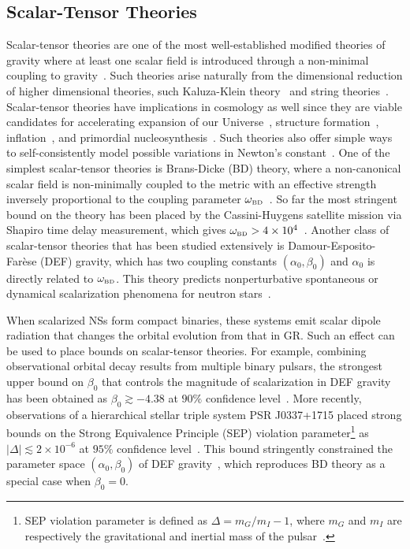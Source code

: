 \documentclass[prd,twocolumn,nofootinbib]{revtex4-1}
\newcommand{\BD}{{\mbox{\tiny BD}}}
\begin{document}
 \subsection{Scalar-Tensor Theories}
Scalar-tensor theories are one of the most well-established modified theories of gravity where at least one scalar field is introduced through a non-minimal coupling to gravity~\cite{Berti:2015itd,Chiba:1997ms,PhysRevD.6.2077}. Such theories arise naturally from the dimensional reduction of higher dimensional theories, such Kaluza-Klein theory~\cite{Fujii:2003pa,Overduin:1998pn} and string theories~\cite{polchinski1,polchinski2}.
Scalar-tensor theories have implications in cosmology as well since they are viable candidates for accelerating expansion of our Universe~\cite{Brax:2004qh,PhysRevD.73.083510,PhysRevD.62.123510,PhysRevD.66.023525,Schimd:2004nq}, structure formation~\cite{Brax:2005ew}, inflation~\cite{Burd:1991ns,Barrow:1990nv,Banerjee:1993ct,Clifton:2011jh}, and primordial nucleosynthesis~\cite{Coc:2006rt,Damour:1998ae,Larena:2005tu,Torres:1995je}. Such theories also offer simple ways to self-consistently model possible variations in Newton's constant~\cite{Clifton:2011jh}. One of the simplest scalar-tensor theories is Brans-Dicke (BD) theory, where a non-canonical scalar field is non-minimally coupled to the metric with an effective strength inversely proportional to the coupling parameter $\omega_{\BD}$~\cite{PhysRev.124.925,Scharre:2001hn}. So far the most stringent bound on the theory has been placed by the Cassini-Huygens satellite mission via Shapiro time delay measurement, which gives $\omega_{\BD}>4\times10^4$~\cite{Bertotti:2003rm}. Another class of scalar-tensor theories that has been studied extensively is Damour-Esposito-Far\`ese (DEF) gravity, which has two coupling constants $(\alpha_0,\beta_0)$ and $\alpha_0$ is directly related to $\omega_\BD$. This theory predicts nonperturbative spontaneous or dynamical scalarization phenomena for neutron stars~\cite{PhysRevLett.70.2220,Barausse:2012da}. 

When scalarized NSs form compact binaries, these systems emit scalar dipole radiation that changes the orbital evolution from that in GR. Such an effect can be used to place bounds on scalar-tensor theories. For example, combining observational orbital decay results from multiple binary pulsars, the strongest upper bound on $\beta_0$ that controls the magnitude of scalarization in DEF gravity has been obtained as $\beta_0\gtrsim -4.38$ at $90\%$ confidence level~\cite{Shao:2017gwu}. More recently, observations of a hierarchical stellar triple system PSR J0337+1715 placed strong bounds on the Strong Equivalence Principle (SEP) violation parameter\footnote{SEP violation parameter is defined as $\Delta=m_G/m_I-1$, where $m_G$ and $m_I$ are respectively the gravitational and inertial mass of the pulsar~\cite{Archibald:2018oxs}.} as $|\Delta|\lesssim 2\times 10^{-6}$ at $95\%$ confidence level~\cite{Archibald:2018oxs}. This bound stringently constrained the parameter space $(\alpha_0,\beta_0)$ of DEF gravity~\cite{PhysRevLett.70.2220,1970ApJ...161.1059N,Bergmann1968,Horbatsch:2010hj,PhysRevD.1.3209}, which reproduces BD theory as a special case when $\beta_0=0$.
\end{document}
